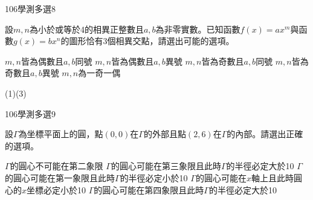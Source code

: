 \begin{QUESTIONS}
    \begin{QUESTION}
        \begin{ExamInfo}{106}{學測}{多選}{8}
        \end{ExamInfo}
        \begin{ExamAnsRateInfo}{24}{35}{20}{17}
        \end{ExamAnsRateInfo}
        \begin{QBODY}
            設$m,n$為小於或等於4的相異正整數且$a,b$為非零實數。已知函數$f(x)=a{{x}^{m}}$與函數$g(x)=b{{x}^{n}}$的圖形恰有3個相異交點，請選出可能的選項。
			\begin{QOPS}
			\QOP $m,n$皆為偶數且$a,b$同號 
			\QOP $m,n$皆為偶數且$a,b$異號
			\QOP $m,n$皆為奇數且$a,b$同號
			\QOP $m,n$皆為奇數且$a,b$異號
			\QOP $m,n$為一奇一偶
			\end{QOPS}
        \end{QBODY}
        \begin{QFROMS}
        \end{QFROMS}
        \begin{QTAGS}\end{QTAGS}
        \begin{QANS}
            (1)(3)
        \end{QANS}
        \begin{QSOLLIST}
        \end{QSOLLIST}
        \begin{QEMPTYSPACE}
        \end{QEMPTYSPACE}
    \end{QUESTION}
    \begin{QUESTION}
        \begin{ExamInfo}{106}{學測}{多選}{9}
        \end{ExamInfo}
        \begin{ExamAnsRateInfo}{34}{57}{30}{15}
        \end{ExamAnsRateInfo}
        \begin{QBODY}
            設$\Gamma $為坐標平面上的圓，點$(0,0)$在$\Gamma $的外部且點$(2,6)$在$\Gamma $的內部。請選出正確的選項。
			\begin{QOPS}
			\QOP $\Gamma $的圓心不可能在第二象限
			\QOP $\Gamma $的圓心可能在第三象限且此時$\Gamma $的半徑必定大於10
			\QOP $\Gamma $的圓心可能在第一象限且此時$\Gamma $的半徑必定小於10
			\QOP $\Gamma $的圓心可能在$x$軸上且此時圓心的$x$坐標必定小於10
			\QOP $\Gamma $的圓心可能在第四象限且此時$\Gamma $的半徑必定大於10

\end{QOPS}
\end{QBODY}
\end{QUESTION}
\end{QUESTIONS}
